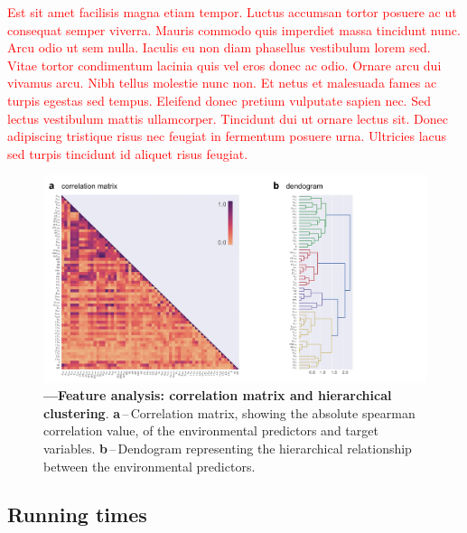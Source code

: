 \documentclass[12pt]{article}
\begin{document}
\par \textcolor{red}{Est sit amet facilisis magna etiam tempor. Luctus accumsan tortor posuere ac ut consequat semper viverra. Mauris commodo quis imperdiet massa tincidunt nunc. Arcu odio ut sem nulla. Iaculis eu non diam phasellus vestibulum lorem sed. Vitae tortor condimentum lacinia quis vel eros donec ac odio. Ornare arcu dui vivamus arcu. Nibh tellus molestie nunc non. Et netus et malesuada fames ac turpis egestas sed tempus. Eleifend donec pretium vulputate sapien nec. Sed lectus vestibulum mattis ullamcorper. Tincidunt dui ut ornare lectus sit. Donec adipiscing tristique risus nec feugiat in fermentum posuere urna. Ultricies lacus sed turpis tincidunt id aliquet risus feugiat.} 

\begin{figure}[t!] %
	\centering                                       
	\includegraphics[width=0.98\linewidth]{figs/clusters.jpg}    
	\caption[Features correlation and clusters]
	{\textbf{---\;Feature analysis: correlation matrix and hierarchical clustering}.
	\textbf{a}\,--\,Correlation matrix, showing the absolute spearman correlation value, of the environmental predictors and target variables. 
        \textbf{b}\,--\,Dendogram representing the hierarchical relationship between the environmental predictors.
	}
    \label{fig:corrmatrix}            
\end{figure}

\subsection{Running times}
\end{document}
